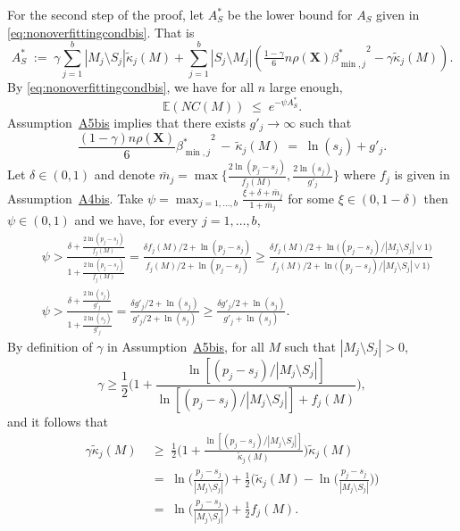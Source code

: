 \documentclass[
  12pt]{article}
\newcommand{\E}{\mathbb{E}}
\newcommand{\bX}{\mathbf{X}}
\begin{document}
For the second step of the proof, let $A_S^*$ be the lower bound for $A_S$ given in \eqref{eq:nonoverfittingcondbis}. That is 
$$A_S^*\;:=\;\gamma\sum_{j=1}^b|M_j \setminus S_j|\tilde{\kappa}_j(M) + \sum_{j=1}^b |S_j\setminus M_j |\left(\tfrac{1-\gamma}{6} n \rho(\bX) {\beta^*_{\min,j}}^{2} - \gamma\tilde{\kappa}_j(M)\right).$$
By \eqref{eq:nonoverfittingcondbis}, we have for all $n$ large enough,
\begin{equation}\label{eq:boundexpbis}
    \E(NC(M))\;\leq\;e^{-\psi A_S^*}.
\end{equation}
Assumption~\hyperlink{lab:A5bis}{A5bis} implies that there exists $g'_j \to \infty$ such that
\begin{equation}\label{eq:ogbeabis}
    \frac{(1-\gamma) n\rho(\bX)}{6}{\beta_{\min,j}^*}^2 \,- \,\tilde{\kappa}_j(M) \;=\; \ln(s_j) + g'_{j}.
\end{equation}
Let $\delta \in (0,1)$ and denote $\bar{m}_j=\max\big\{\frac{2\ln(p_j-s_j)}{f_j(M)},\frac{2\ln(s_j)}{g'_{j}}\big\}$ where $f_j$ is given in Assumption~\hyperlink{lab:A4bis}{A4bis}. 
Take $\psi=\max_{j=1,\ldots,b}\frac{\xi + \delta + \bar{m}_j}{1+\bar{m}_j}$ for some $\xi \in(0, 1- \delta)$ then $\psi \in (0,1)$ and we have, for every $j=1,\ldots,b$,
\begin{align}
    &\psi > \frac{\delta + \frac{2\ln(p_j-s_j)}{f_j(M)}}{1+\frac{2\ln(p_j-s_j)}{f_j(M)}} = \frac{\delta f_j(M)/2 + \ln(p_j-s_j)}{f_j(M)/2 +\ln(p_j-s_j)} \geq \frac{\delta f_j(M)/2 + \ln\big((p_j-s_j)/|M_j\setminus S_j|\vee 1\big)}{f_j(M)/2 +\ln\big((p_j-s_j)/|M_j\setminus S_j|\vee 1\big)}\label{eq:psifbis}\\
    &\psi > \frac{\delta + \frac{2\ln(s_j)}{g'_j}}{1+\frac{2\ln(s_j)}{g'_j}} = \frac{\delta g'_j/2 + \ln(s_j)}{g'_j/2 +\ln(s_j)} \geq \frac{\delta g'_j/2 + \ln(s_j)}{g'_j +\ln(s_j)}.\label{eq:psigbis}
\end{align}
By definition of $\gamma$ in Assumption~\hyperlink{lab:A5bis}{A5bis}, for all $M$ such that $|M_j\setminus S_j|>0$, $$\gamma \geq \frac12\Bigg(1+ \frac{\ln[(p_j-s_j)/|M_j\setminus S_j|]}{\ln[(p_j-s_j)/|M_j\setminus S_j|] + f_j(M)}\Bigg),$$ and it follows that 
\begin{align*}
    \gamma\tilde{\kappa}_j(M)
    &\;\geq\;\frac12 \Big(1+\frac{\ln[(p_j-s_j)/|M_j\setminus S_j|]}{\tilde{\kappa}_j(M)}\Big)\tilde{\kappa}_j(M)\\
    &\;=\;\ln\Big(\frac{p_j-s_j}{|M_j\setminus S_j|}\Big)+\frac12\Big(\tilde{\kappa}_j(M)-\ln\Big(\frac{p_j-s_j}{|M_j\setminus S_j|}\Big)\Big)\\
    & \;=\; \ln\Big(\frac{p_j-s_j}{|M_j\setminus S_j|}\Big)+ \frac12f_j(M).
\end{align*}
\end{document}
